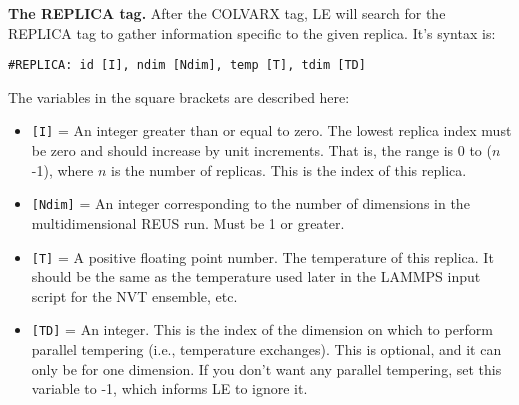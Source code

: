 \documentclass[10pt]{article}
\begin{document}
\textbf{The REPLICA tag.}
After the COLVARX tag, LE will search for the REPLICA tag to gather information specific
to the given replica. It's syntax is:
\begin{verbatim}
#REPLICA: id [I], ndim [Ndim], temp [T], tdim [TD]
\end{verbatim}
The variables in the square brackets are described here:
\begin{itemize}
\item	\texttt{[I]} = An integer greater than or equal to zero. The lowest
		replica index must be zero and should increase by unit increments. That is,
		the range is 0 to ($n$-1), where $n$ is the number of replicas. This is
		the index of this replica.
\item	\texttt{[Ndim]} = An integer corresponding to the number of dimensions
		in the multidimensional REUS run. Must be 1 or greater.
\item	\texttt{[T]} = A positive floating point number. The temperature of this replica.
		It should be the same as the temperature used later in the LAMMPS input script
		for the NVT ensemble, etc.
\item	\texttt{[TD]} = An integer. This is the index of the dimension on which to perform
		parallel tempering (i.e., temperature exchanges). This is optional, and it can only be
		for one dimension. If you don't want any parallel tempering, set this variable to -1,
		which informs LE to ignore it.
\end{itemize}
\end{document}
